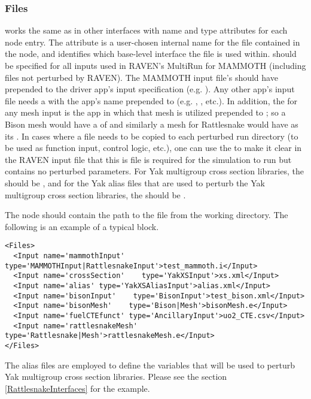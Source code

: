 \subsubsection{Files}
 works the same as in other interfaces with name and type
attributes for each node entry.  The  attribute is a user-chosen internal
name for the file contained in the node, and  identifies which base-level
interface the file is used within.   should be specified for all inputs
used in RAVEN's MultiRun for MAMMOTH (including files not perturbed by RAVEN).
The MAMMOTH input file's  should have  prepended
to the driver app's input specification (e.g. ).
Any other app's input file needs a  with the app's name prepended to 
(e.g. , , etc.).  In addition, the  for any mesh
input is the app in which that mesh is utilized prepended to ; so a Bison mesh would have
a  of  and similarly a mesh for Rattlesnake would have 
as its . In cases where a file needs to be copied to each perturbed run
directory (to be used as function input, control logic, etc.), one can use the 
 to make it clear in the RAVEN input file that this is file
is required for the simulation to run but contains no perturbed parameters.
For Yak multigroup cross section libraries,
the  should be , and for the Yak
alias files that are used to perturb the Yak multigroup cross section libraries, the  should be
.

The node should contain the path to the file from the working directory.
The following is an example of a typical  block.
%
\begin{lstlisting}[style=XML]
<Files>
  <Input name='mammothInput' type='MAMMOTHInput|RattlesnakeInput'>test_mammoth.i</Input>
  <Input name='crossSection'    type='YakXSInput'>xs.xml</Input>
  <Input name='alias' type='YakXSAliasInput'>alias.xml</Input>
  <Input name='bisonInput'    type='BisonInput'>test_bison.xml</Input>
  <Input name='bisonMesh'    type='Bison|Mesh'>bisonMesh.e</Input>
  <Input name='fuelCTEfunct' type='AncillaryInput'>uo2_CTE.csv</Input>
  <Input name='rattlesnakeMesh'    type='Rattlesnake|Mesh'>rattlesnakeMesh.e</Input>
</Files>
\end{lstlisting}
%
The alias files are employed to define the variables that will be used to perturb Yak multigroup cross section
libraries. Please see the section \ref{RattlesnakeInterfaces} for the example.
%
